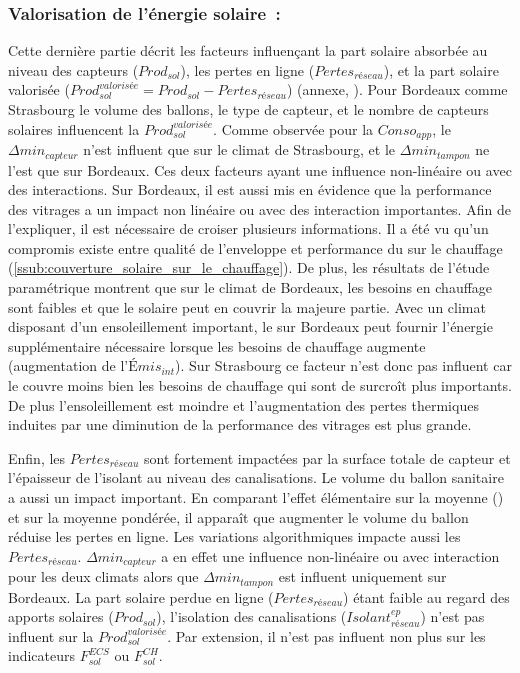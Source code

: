 \subsubsection{Valorisation de l’énergie solaire~:} %
\label{ssub:valorisation_de_l_energie_solaire}
Cette dernière partie décrit les facteurs influençant la part solaire absorbée au niveau
des capteurs ($Prod_{sol}$), les pertes en ligne ($Pertes_{réseau}$), et la part solaire
valorisée ($Prod_{sol}^{valorisée} = Prod_{sol} - Pertes_{réseau}$) (annexe,
). Pour Bordeaux comme Strasbourg le volume des
ballons, le type de capteur, et le nombre de capteurs solaires influencent la
$Prod_{sol}^{valorisée}$. Comme observée pour la $Conso_{app}$, le $\Delta min_{capteur}$
n’est influent que sur le climat de Strasbourg, et le $\Delta min_{tampon}$ ne l’est que
sur Bordeaux. Ces deux facteurs ayant une influence non-linéaire ou avec des interactions.
Sur Bordeaux, il est aussi mis en évidence que la performance des vitrages a un impact non
linéaire ou avec des interaction importantes. Afin de l’expliquer, il est nécessaire de
croiser plusieurs informations. Il a été vu qu’un compromis existe entre qualité de
l’enveloppe et performance du  sur le chauffage
(\ref{ssub:couverture_solaire_sur_le_chauffage}). De plus, les résultats de l’étude
paramétrique montrent que sur le climat de Bordeaux, les besoins en chauffage sont faibles
et que le solaire peut en couvrir la majeure partie. Avec un climat disposant d’un
ensoleillement important, le  sur Bordeaux peut fournir l’énergie supplémentaire
nécessaire lorsque les besoins de chauffage augmente (augmentation de l’$Émis_{int}$). Sur
Strasbourg ce facteur n’est donc pas influent car le  couvre moins bien les
besoins de chauffage qui sont de surcroît plus importants. De plus l’ensoleillement est
moindre et l’augmentation des pertes thermiques induites par une diminution de la
performance des vitrages est plus grande.

Enfin, les $Pertes_{réseau}$ sont fortement impactées par la surface totale de capteur et
l’épaisseur de l’isolant au niveau des canalisations. Le volume du ballon sanitaire a
aussi un impact important. En comparant l’effet élémentaire sur la moyenne
() et sur la moyenne pondérée, il apparaît que augmenter
le volume du ballon réduise les pertes en ligne. Les variations algorithmiques impacte
aussi les $Pertes_{réseau}$. $\Delta min_{capteur}$ a en effet une influence non-linéaire
ou avec interaction pour les deux climats alors que $\Delta min_{tampon}$ est influent
uniquement sur Bordeaux. La part solaire perdue en ligne ($Pertes_{réseau}$) étant faible
au regard des apports solaires ($Prod_{sol}$), l’isolation des canalisations
($Isolant_{réseau}^{ep}$) n’est pas influent sur la $Prod_{sol}^{valorisée}$. Par
extension, il n’est pas influent non plus sur les indicateurs $F_{sol}^{ECS}$ ou
$F_{sol}^{CH}$.



